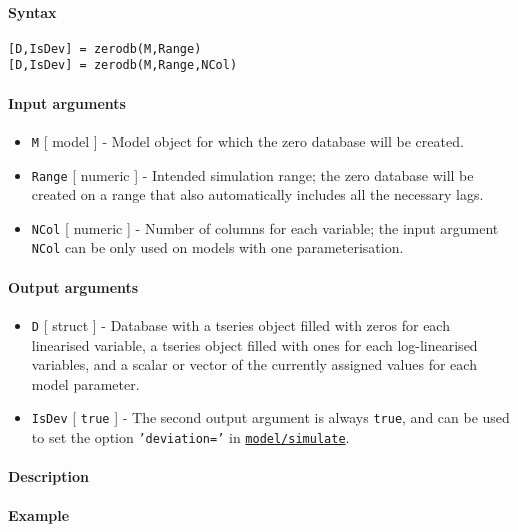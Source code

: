 


	\paragraph{Syntax}

\begin{verbatim}
[D,IsDev] = zerodb(M,Range)
[D,IsDev] = zerodb(M,Range,NCol)
\end{verbatim}

\paragraph{Input arguments}

\begin{itemize}
\item
  \texttt{M} {[} model {]} - Model object for which the zero database
  will be created.
\item
  \texttt{Range} {[} numeric {]} - Intended simulation range; the zero
  database will be created on a range that also automatically includes
  all the necessary lags.
\item
  \texttt{NCol} {[} numeric {]} - Number of columns for each variable;
  the input argument \texttt{NCol} can be only used on models with one
  parameterisation.
\end{itemize}

\paragraph{Output arguments}

\begin{itemize}
\item
  \texttt{D} {[} struct {]} - Database with a tseries object filled with
  zeros for each linearised variable, a tseries object filled with ones
  for each log-linearised variables, and a scalar or vector of the
  currently assigned values for each model parameter.
\item
  \texttt{IsDev} {[} \texttt{true} {]} - The second output argument is
  always \texttt{true}, and can be used to set the option
  \texttt{'deviation='} in
  \href{model/simulate}{\texttt{model/simulate}}.
\end{itemize}

\paragraph{Description}

\paragraph{Example}


